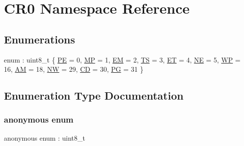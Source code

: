 \hypertarget{namespace_c_r0}{}\section{C\+R0 Namespace Reference}
\label{namespace_c_r0}
\subsection*{Enumerations}
\begin{DoxyCompactItemize}
\item 
enum \+: uint8\+\_\+t \{ \newline
\hyperlink{namespace_c_r0_ad023cbd7e6972678c8d8e7bc35db401aa7f3a9f7cae8ff9783116b3807a9e7f63}{PE} = 0, 
\hyperlink{namespace_c_r0_ad023cbd7e6972678c8d8e7bc35db401aa5d476977d06d7c0b03c9c15c07a79a67}{MP} = 1, 
\hyperlink{namespace_c_r0_ad023cbd7e6972678c8d8e7bc35db401aa7b84c2b5b161093766d5ce338ae954fd}{EM} = 2, 
\hyperlink{namespace_c_r0_ad023cbd7e6972678c8d8e7bc35db401aa11d3ddf6dc3d1d972c1df841c8612a98}{TS} = 3, 
\newline
\hyperlink{namespace_c_r0_ad023cbd7e6972678c8d8e7bc35db401aaea1442f406aa6dac094cac2466be6da7}{ET} = 4, 
\hyperlink{namespace_c_r0_ad023cbd7e6972678c8d8e7bc35db401aaec96b199175e3576b8864dc1ac07ac4e}{NE} = 5, 
\hyperlink{namespace_c_r0_ad023cbd7e6972678c8d8e7bc35db401aa26b870d7f1a47ad83f6c2ce739189171}{WP} = 16, 
\hyperlink{namespace_c_r0_ad023cbd7e6972678c8d8e7bc35db401aa2325d7d071248d4efffdf7bd809decb7}{AM} = 18, 
\newline
\hyperlink{namespace_c_r0_ad023cbd7e6972678c8d8e7bc35db401aa09776e60fc989f19ae0f04a402d2d1bb}{NW} = 29, 
\hyperlink{namespace_c_r0_ad023cbd7e6972678c8d8e7bc35db401aa4154f3b5cb906ec0bfab20c87e8a7d84}{CD} = 30, 
\hyperlink{namespace_c_r0_ad023cbd7e6972678c8d8e7bc35db401aa674029f08e40b913896b27f5cb5e1ec8}{PG} = 31
 \}
\end{DoxyCompactItemize}


\subsection{Enumeration Type Documentation}
\mbox{\label{namespace_c_r0_ad023cbd7e6972678c8d8e7bc35db401a}} 
\subsubsection{\texorpdfstring{anonymous enum}{anonymous enum}}
{\footnotesize\ttfamily anonymous enum \+: uint8\+\_\+t}


